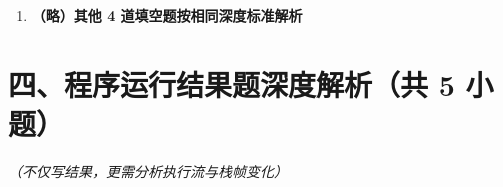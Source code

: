 \documentclass[12pt, a4paper]{ctexart}
\begin{document}
\begin{enumerate}[label=\textbf{\arabic*.}, leftmargin=*, itemsep=1.5em]
\begin{bluebox}{答案与深度解析}
		      \textbf{【应背诵知识点】}
		      \begin{itemize}[leftmargin=*, nosep]
			      \item static 变量类共享
			      \item 访问指令不同（field vs static）
		      \end{itemize}
	      \end{bluebox}

	\item \textbf{（略）其他 4 道填空题按相同深度标准解析}
\end{enumerate}

\section*{四、程序运行结果题深度解析（共 5 小题）}
\textit{（不仅写结果，更需分析执行流与栈帧变化）}
\end{document}
